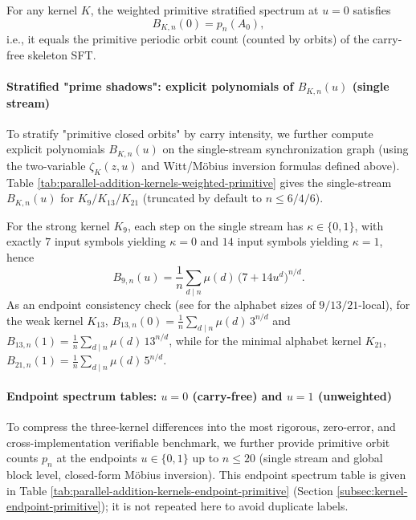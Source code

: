 \begin{corollary}\label{cor:Bn0-equals-primitive-skeleton}
For any kernel $K$, the weighted primitive stratified spectrum at $u=0$ satisfies
\[
B_{K,n}(0)=p_n(A_0),
\]
i.e., it equals the primitive periodic orbit count (counted by orbits) of the carry-free skeleton SFT.
\end{corollary}




\paragraph{Stratified "prime shadows": explicit polynomials of \texorpdfstring{$B_{K,n}(u)$}{B\_{K,n}(u)} (single stream)}
To stratify "primitive closed orbits" by carry intensity, we further compute explicit polynomials $B_{K,n}(u)$ on the single-stream synchronization graph (using the two-variable $\zeta_K(z,u)$ and Witt/M\"obius inversion formulas defined above). Table \ref{tab:parallel-addition-kernels-weighted-primitive} gives the single-stream $B_{K,n}(u)$ for $K_9/K_{13}/K_{21}$ (truncated by default to $n\le 6/4/6$).
\par
For the strong kernel $K_9$, each step on the single stream has $\kappa\in\{0,1\}$, with exactly $7$ input symbols yielding $\kappa=0$ and $14$ input symbols yielding $\kappa=1$, hence
\[
B_{9,n}(u)=\frac{1}{n}\sum_{d\mid n}\mu(d)\,\bigl(7+14u^d\bigr)^{n/d}.
\]
As an endpoint consistency check (see \cite{FrougnyHellerPelantovaSvobodovaParallelAlgorithmsSlides} for the alphabet sizes of $9/13/21$-local), for the weak kernel $K_{13}$,
\(
B_{13,n}(0)=\frac{1}{n}\sum_{d\mid n}\mu(d)\,3^{n/d}
\)
and
\(
B_{13,n}(1)=\frac{1}{n}\sum_{d\mid n}\mu(d)\,13^{n/d}
\),
while for the minimal alphabet kernel $K_{21}$,
\(
B_{21,n}(1)=\frac{1}{n}\sum_{d\mid n}\mu(d)\,5^{n/d}.
\)


\paragraph{Endpoint spectrum tables: \texorpdfstring{$u=0$}{u=0} (carry-free) and \texorpdfstring{$u=1$}{u=1} (unweighted)}
To compress the three-kernel differences into the most rigorous, zero-error, and cross-implementation verifiable benchmark, we further provide primitive orbit counts $p_n$ at the endpoints $u\in\{0,1\}$ up to $n\le 20$ (single stream and global block level, closed-form M\"obius inversion). This endpoint spectrum table is given in Table \ref{tab:parallel-addition-kernels-endpoint-primitive} (Section \ref{subsec:kernel-endpoint-primitive}); it is not repeated here to avoid duplicate labels.

